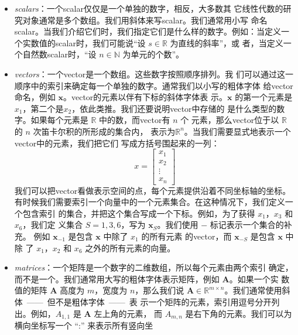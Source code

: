 \begin{itemize}
\item \emph{\gls{scalars}}：一个\gls*{scalar}仅仅是一个单独的数字，相反，大多数其
  它线性代数的研究对象通常是多个数组。我们用斜体来写\gls*{scalar}。我们通常用小写
  命名\gls*{scalar}。当我们介绍它们时，我们指定它们是什么样的数字。例如：当定义一
  个实数值的\gls*{scalar}时，我们可能说``设 $s \in \mathbb{R}$ 为直线的斜率''，或
  者，当定义一个自然数\gls*{scalar}时，``设 $n \in \mathbb{N}$ 为单元的个数''。
\item \emph{\gls{vectors}}：一个\gls*{vector}是一个数组。这些数字按照顺序排列。我
  们可以通过这一顺序中的索引来确定每一个单独的数字。通常我们以小写的粗体字体
  给\gls*{vector}命名，例如 $\pmb{x}$。\gls*{vector}的元素以伴有下标的斜体字体表
  示。$\pmb{x}$
  的第一个元素是$x_1$，第二个是$x_2$，依此类推。我们还要说明\gls*{vector}中存储的
  是什么类型的数字。如果每个元素是 $\mathbb{R}$ 中的数，而\gls*{vector}有 $n$ 个
  元素，那么\gls*{vector}位于以 $\mathbb{R}$ 的 $n$ 次笛卡尔积的所形成的集合内，
  表示为$\mathbb{R}^n$。当我们需要显式地表示一个\gls*{vector}中的元素，我们把它们
  写成方括号围起来的一列：
  \begin{equation}
    x = \begin{bmatrix}x_1\\ x_2\\ \vdots\\ x_n\end{bmatrix}
    \label{eq:vector_example}
  \end{equation}
  我们可以把\gls*{vector}看做表示空间的点，每个元素提供沿着不同坐标轴的坐标。\\
  有时候我们需要索引一个向量中的一个元素集合。在这种情况下，我们定义一个包含索引
  的集合，并把这个集合写成一个下标。例如，为了获得 $x_1$，$x_3$ 和 $x_6$，我们定
  义集合 $S = {1, 3, 6}$，写为 $\pmb{x}_S$。我们使用 $-$ 标记表示一个集合的补充。
  例如 $\pmb{x}_{-1}$ 是包含 $\pmb{x}$ 中除了 $x_1$ 的所有元素
  的\gls*{vector}，而 $\pmb{x}_{-S}$ 是包含 $\pmb{x}$ 中除
  了 $x_1$，$x_2$ 和 $x_6$ 之外的所有元素的向量。
\item \emph{\gls{matrices}}：一个矩阵是一个数字的二维数组，所以每个元素由两个索引
  确定，而不是一个。我们通常用大写的粗体字体表示矩阵，例如 $\pmb{A}$。如果一个实
  数值的矩阵 $\pmb{A}$ 高度为 $m$，宽度为 $n$，那么我们说
  $\pmb{A} \in \mathbb{R}^{m \times n}$。我们通常使用斜体~——~但不是粗体字体~——~表
  示一个矩阵的元素，索引用逗号分开列出。例如，$A_{1,1}$ 是 $\pmb{A}$ 左上角的元素，
  而 $A_{m,n}$ 是右下角的元素。我们可以为横向坐标写一个 ``:'' 来表示所有竖向坐

\end{itemize}
